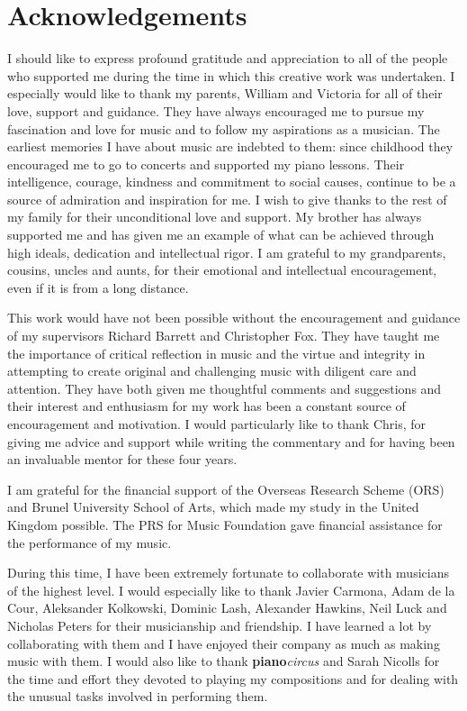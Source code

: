 \chapter*{Acknowledgements}

I should like to express profound gratitude and appreciation to all of the people who supported me during the time in which this creative work was undertaken. I especially would like to thank my parents, William and Victoria for all of their love, support and guidance. They have always encouraged me to pursue my fascination and love for music and to follow my aspirations as a musician. The earliest memories I have about music are indebted to them: since childhood they encouraged me to go to concerts and supported my piano lessons. Their intelligence, courage, kindness and commitment to social causes, continue to be a source of admiration and inspiration for me. I wish to give thanks to the rest of my family for their unconditional love and support. My brother has always supported me and has given me an example of what can be achieved through high ideals, dedication and intellectual rigor. I am grateful to my grandparents, cousins, uncles and aunts, for their emotional and intellectual encouragement, even if it is from a long distance.

This work would have not been possible without the encouragement and guidance of my supervisors Richard Barrett and Christopher Fox. They have taught me the importance of  critical reflection in music and the virtue and integrity in attempting to create original and challenging music with diligent care and attention. They have both given me thoughtful comments and suggestions and their interest and enthusiasm for my work has been a constant source of encouragement and motivation. I would particularly like to thank Chris, for giving me advice and support while writing the commentary and for having been an invaluable mentor for these four years.

I am grateful for the financial support of the Overseas Research Scheme (ORS) and Brunel University School of Arts, which made my study in the United Kingdom possible. The PRS for Music Foundation gave financial assistance for the performance of my music.

During this time, I have been extremely fortunate to collaborate with musicians of the highest level. I would especially like to thank Javier Carmona, Adam de la Cour, Aleksander Kolkowski, Dominic Lash, Alexander Hawkins, Neil Luck and Nicholas Peters for their musicianship and friendship. I have learned a lot by collaborating with them and I have enjoyed their company as much as making music with them. I would also like to thank \textbf{piano}\emph{circus} and Sarah Nicolls for the time and effort they devoted to playing my compositions and for dealing with the unusual tasks involved in performing them.
 
